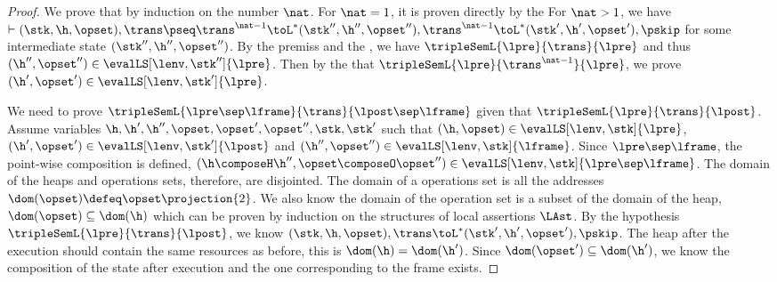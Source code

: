 \begin{proof}
We prove that by induction on the number \( \nat \).
For \( \nat = 1 \), it is proven directly by the \ih
For \( \nat > 1 \), we have \( \vdash (\stk, \h, \opset), \trans \pseq \trans^{\nat - 1} \toL^{*} (\stk'', \h'', \opset''), \trans^{\nat - 1} \toL^{*} (\stk', \h', \opset'), \pskip \) for some intermediate state \( ( \stk'', \h'', \opset'' ) \).
By the premiss and the \ih, we have \(\tripleSemL{\lpre}{\trans}{\lpre} \) and thus \(  (\h'', \opset'') \in \evalLS[\lenv, \stk'']{\lpre} \).
Then by the \ih that \(\tripleSemL{\lpre}{\trans^{\nat - 1}}{\lpre} \), we prove \(  (\h', \opset') \in \evalLS[\lenv, \stk']{\lpre} \).


We need to prove \( \tripleSemL{\lpre \sep \lframe }{\trans}{\lpost \sep \lframe} \) given that \( \tripleSemL{\lpre}{\trans}{\lpost} \).
Assume variables \( \h, \h', \h'', \opset, \opset', \opset'', \stk, \stk' \) such that \( ( \h, \opset ) \in \evalLS[\lenv, \stk]{\lpre} \), \( ( \h', \opset' ) \in \evalLS[\lenv, \stk']{\lpost} \) and \( ( \h'', \opset'' ) \in \evalLS[\lenv, \stk]{\lframe}\).
Since \( \lpre \sep \lframe \), the point-wise composition is defined, \ie \( (\h \composeH \h'', \opset \composeO \opset'') \in \evalLS[\lenv, \stk]{\lpre \sep \lframe} \).
The domain of the heaps and operations sets, therefore, are disjointed.
The domain of a operations set is all the addresses \( \dom(\opset) \defeq \opset\projection{2}\).
We also know the domain of the operation set is a subset of the domain of the heap, \(\dom(\opset) \subseteq \dom(\h) \) which can be proven by induction on the structures of local assertions \( \LAst \).
By the hypothesis \( \tripleSemL{\lpre}{\trans}{\lpost} \), we know \( ( \stk, \h, \opset ), \trans \toL^{*} ( \stk', \h', \opset' ), \pskip \).
The heap after the execution should contain the same resources as before, this is \( \dom(\h) = \dom(\h') \).
Since \( \dom(\opset') \subseteq \dom(\h') \), we know the composition of the state after execution and the one corresponding to the frame exists.



\end{proof}
